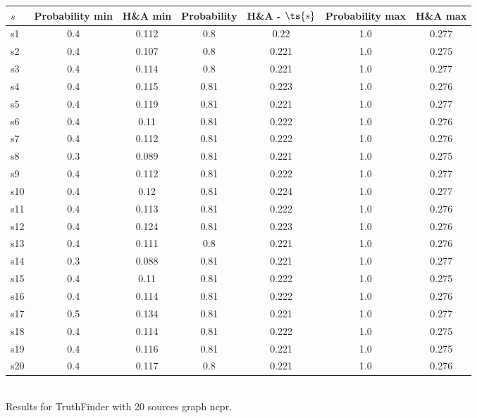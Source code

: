 \documentclass{article}
\begin{document}
\noindent\begin{tabular}{|l|c|c|c|c|c|c|}
\hline
$s$& Probability min & H\&A min & Probability & H\&A - $\ts{s}$ & Probability max & H\&A max\\
\hline
s1 &0.4 & 0.112 & 0.8 & 0.22 & 1.0 & 0.277\\
\hline
s2 &0.4 & 0.107 & 0.8 & 0.221 & 1.0 & 0.275\\
\hline
s3 &0.4 & 0.114 & 0.8 & 0.221 & 1.0 & 0.277\\
\hline
s4 &0.4 & 0.115 & 0.81 & 0.223 & 1.0 & 0.276\\
\hline
s5 &0.4 & 0.119 & 0.81 & 0.221 & 1.0 & 0.277\\
\hline
s6 &0.4 & 0.11 & 0.81 & 0.222 & 1.0 & 0.276\\
\hline
s7 &0.4 & 0.112 & 0.81 & 0.222 & 1.0 & 0.276\\
\hline
s8 &0.3 & 0.089 & 0.81 & 0.221 & 1.0 & 0.275\\
\hline
s9 &0.4 & 0.112 & 0.81 & 0.222 & 1.0 & 0.277\\
\hline
s10 &0.4 & 0.12 & 0.81 & 0.224 & 1.0 & 0.277\\
\hline
s11 &0.4 & 0.113 & 0.81 & 0.222 & 1.0 & 0.276\\
\hline
s12 &0.4 & 0.124 & 0.81 & 0.223 & 1.0 & 0.276\\
\hline
s13 &0.4 & 0.111 & 0.8 & 0.221 & 1.0 & 0.276\\
\hline
s14 &0.3 & 0.088 & 0.81 & 0.221 & 1.0 & 0.277\\
\hline
s15 &0.4 & 0.11 & 0.81 & 0.222 & 1.0 & 0.275\\
\hline
s16 &0.4 & 0.114 & 0.81 & 0.222 & 1.0 & 0.276\\
\hline
s17 &0.5 & 0.134 & 0.81 & 0.221 & 1.0 & 0.277\\
\hline
s18 &0.4 & 0.114 & 0.81 & 0.222 & 1.0 & 0.275\\
\hline
s19 &0.4 & 0.116 & 0.81 & 0.221 & 1.0 & 0.275\\
\hline
s20 &0.4 & 0.117 & 0.8 & 0.221 & 1.0 & 0.276\\
\hline
\end{tabular}\\

\noindent Results for TruthFinder with 20 sources graph ncpr.
\end{document}
